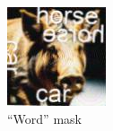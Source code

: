 \documentclass[a4paper, oneside]{discothesis}
\begin{document}
\begin{figure}[th]
	\hfill
	\begin{subfigure}[t]{0.19\textwidth}\centering\includegraphics[width=\linewidth]{figures/hcaptcha-word.png}\caption{``Word'' mask}\label{fig:subfig4}\end{subfigure}
	\hfill
	\begin{subfigure}[t]{0.19\textwidth}\centering{}\end{subfigure}
	

\end{figure}
\end{document}
